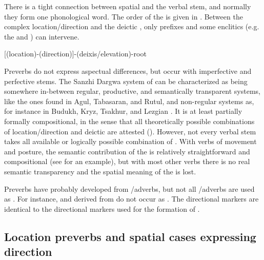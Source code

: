 There is a tight connection between spatial  and the verbal stem, and normally they form one phonological word. The order of the  is given in . Between the complex location/direction and the deictic , only  prefixes and some enclitics (e.g. the   and  ) can intervene.
%
\begin{exe}
	\ex	\mbox{[(location)-(direction)]-(deixis/elevation)-root}	\label{ex:preverb affixation order}
\end{exe}

Preverbs do not express aspectual differences, but occur with imperfective and perfective stems. The Sanzhi Dargwa system of  can be characterized as being somewhere in-between regular, productive, and semantically transparent systems, like the ones found in Agul, Tabasaran, and Rutul, and non-regular systems as, for instance in Budukh, Kryz, Tsakhur, and Lezgian \citep{Tatevosov2000, Nichols2003, Ganenkov2007}. It is at least partially formally compositional, in the sense that all theoretically possible combinations of location/direction and deictic  are attested (). However, not every verbal stem takes all available  or logically possible combination of . With verbs of movement and posture, the semantic contribution of the  is relatively straightforward and compositional (see  for an example), but with most other verbs there is no real semantic transparency and the spatial meaning of the  is lost.

Preverbs have probably developed from /adverbs, but not all /adverbs are used as . For instance,   and  derived from  do not occur as . The directional markers are identical to the directional markers used for the formation of .



\subsection{Location preverbs and spatial cases expressing direction}
\label{ssec:Location preverbs and spatial cases expressing direction}

